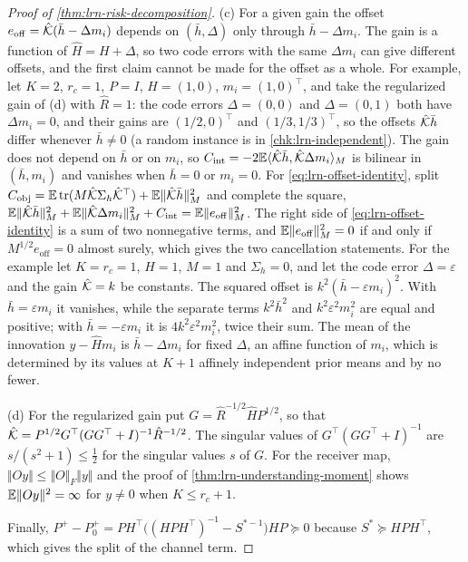 \begin{proof}[Proof of \cref{thm:lrn-risk-decomposition}]
(c) For a given gain the offset $e_{\mathrm{off}}=\hat{\mathcal{K}}(\bar h-\Delta m_i)$ depends on $(\bar h,\Delta)$ only through $\bar h-\Delta m_i$. The gain is a function of $\hat H=H+\Delta$, so two code errors with the same $\Delta m_i$ can give different offsets, and the first claim cannot be made for the offset as a whole. For example, let $K=2$, $r_c=1$, $P=I$, $H=(1,0)$, $m_i=(1,0)^\top$, and take the regularized gain of (d) with $\hat R=1$: the code errors $\Delta=(0,0)$ and $\Delta=(0,1)$ both have $\Delta m_i=0$, and their gains are $(1/2,0)^\top$ and $(1/3,1/3)^\top$, so the offsets $\hat{\mathcal{K}}\bar h$ differ whenever $\bar h\ne0$ (a random instance is in \cref{chk:lrn-independent}). The gain does not depend on $\bar h$ or on $m_i$, so $C_{\mathrm{int}}=-2\mathbb{E}\langle\hat{\mathcal{K}}\bar h,\hat{\mathcal{K}}\Delta m_i\rangle_M$ is bilinear in $(\bar h,m_i)$ and vanishes when $\bar h=0$ or $m_i=0$. For \cref{eq:lrn-offset-identity}, split $C_{\mathrm{obj}}=\mathbb{E}\operatorname{tr}(M\hat{\mathcal{K}}\Sigma_h\hat{\mathcal{K}}^\top)+\mathbb{E}\Vert\hat{\mathcal{K}}\bar h\Vert_M^2$ and complete the square, $\mathbb{E}\Vert\hat{\mathcal{K}}\bar h\Vert_M^2+\mathbb{E}\Vert\hat{\mathcal{K}}\Delta m_i\Vert_M^2+C_{\mathrm{int}}=\mathbb{E}\Vert e_{\mathrm{off}}\Vert_M^2$. The right side of \cref{eq:lrn-offset-identity} is a sum of two nonnegative terms, and $\mathbb{E}\Vert e_{\mathrm{off}}\Vert_M^2=0$ if and only if $M^{1/2}e_{\mathrm{off}}=0$ almost surely, which gives the two cancellation statements. For the example let $K=r_c=1$, $H=1$, $M=1$ and $\Sigma_h=0$, and let the code error $\Delta=\varepsilon$ and the gain $\hat{\mathcal{K}}=k$ be constants. The squared offset is $k^2(\bar h-\varepsilon m_i)^2$. With $\bar h=\varepsilon m_i$ it vanishes, while the separate terms $k^2\bar h^2$ and $k^2\varepsilon^2m_i^2$ are equal and positive; with $\bar h=-\varepsilon m_i$ it is $4k^2\varepsilon^2m_i^2$, twice their sum. The mean of the innovation $y-\hat Hm_i$ is $\bar h-\Delta m_i$ for fixed $\Delta$, an affine function of $m_i$, which is determined by its values at $K+1$ affinely independent prior means and by no fewer.

(d) For the regularized gain put $G=\hat R^{-1/2}\hat HP^{1/2}$, so that $\hat{\mathcal{K}}=P^{1/2}G^\top(GG^\top+I)^{-1}\hat R^{-1/2}$. The singular values of $G^\top(GG^\top+I)^{-1}$ are $s/(s^2+1)\le\tfrac12$ for the singular values $s$ of $G$. For the receiver map, $\Vert Oy\Vert\le\Vert O\Vert_F\Vert y\Vert$ and the proof of \cref{thm:lrn-understanding-moment} shows $\mathbb{E}\Vert Oy\Vert^2=\infty$ for $y\ne0$ when $K\le r_c+1$.

Finally, $P^+-P^+_0=PH^\top\bigl((HPH^\top)^{-1}-S^{\ast-1}\bigr)HP\succeq0$ because $S^\ast\succeq HPH^\top$, which gives the split of the channel term.
\end{proof}


